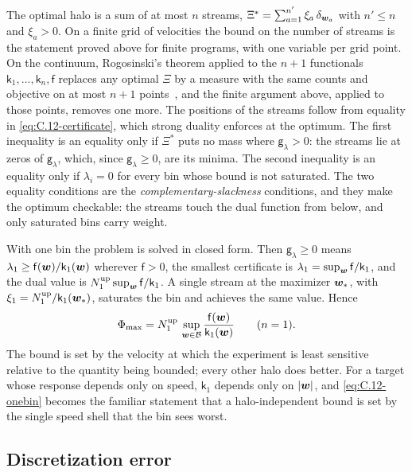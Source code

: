 The optimal halo is a sum of at most $n$ streams, $\Xi^* = \sum_{a=1}^{n'}\xi_a\,\delta_{\bm{w}_a}$ with $n' \le n$ and $\xi_a > 0$. On a finite grid of velocities the bound on the number of streams is the statement proved above for finite programs, with one variable per grid point. On the continuum, Rogosinski's theorem applied to the $n + 1$ functionals $\mathsf{k}_1, \dots, \mathsf{k}_n, \mathsf{f}$ replaces any optimal $\Xi$ by a measure with the same counts and objective on at most $n + 1$ points~\cite{rogosinski1958moments}, and the finite argument above, applied to those points, removes one more. The positions of the streams follow from equality in \cref{eq:C.12-certificate}, which strong duality enforces at the optimum. The first inequality is an equality only if $\Xi^*$ puts no mass where $\mathsf{g}_\lambda > 0$: the streams lie at zeros of $\mathsf{g}_\lambda$, which, since $\mathsf{g}_\lambda \ge 0$, are its minima. The second inequality is an equality only if $\lambda_i = 0$ for every bin whose bound is not saturated. The two equality conditions are the \emph{complementary-slackness} conditions, and they make the optimum checkable: the streams touch the dual function from below, and only saturated bins carry weight.

With one bin the problem is solved in closed form. Then $\mathsf{g}_\lambda \ge 0$ means $\lambda_1 \ge \mathsf{f}(\bm{w})/\mathsf{k}_1(\bm{w})$ wherever $\mathsf{f} > 0$, the smallest certificate is $\lambda_1 = \sup_{\bm{w}}\mathsf{f}/\mathsf{k}_1$, and the dual value is $N_1^{\mathrm{up}}\sup_{\bm{w}}\mathsf{f}/\mathsf{k}_1$. A single stream at the maximizer $\bm{w}_*$, with $\xi_1 = N_1^{\mathrm{up}}/\mathsf{k}_1(\bm{w}_*)$, saturates the bin and achieves the same value. Hence
\begin{equation}
  \Phi_{\max} = N_1^{\mathrm{up}}\,\sup_{\bm{w} \in \mathcal{B}}\frac{\mathsf{f}(\bm{w})}{\mathsf{k}_1(\bm{w})} \qquad (n = 1) .
  \label{eq:C.12-onebin}
\end{equation}
The bound is set by the velocity at which the experiment is least sensitive relative to the quantity being bounded; every other halo does better. For a target whose response depends only on speed, $\mathsf{k}_1$ depends only on $|\bm{w}|$, and \cref{eq:C.12-onebin} becomes the familiar statement that a halo-independent bound is set by the single speed shell that the bin sees worst.

\subsection{Discretization error}

